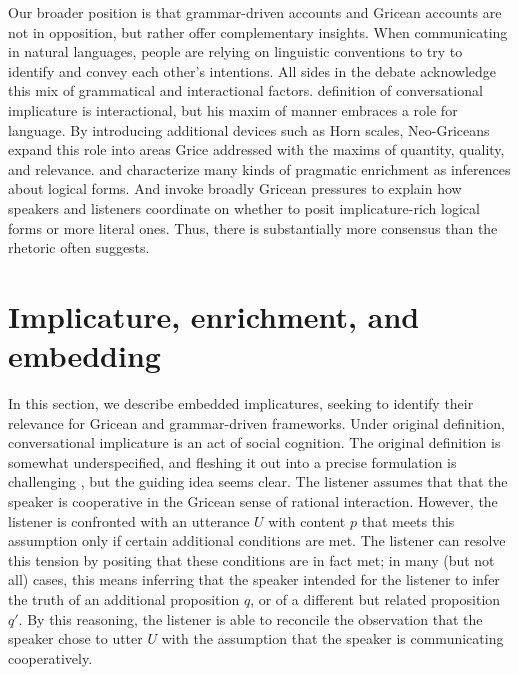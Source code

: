 \documentclass[leqno,12pt]{article}
\begin{document}
Our broader position is that grammar-driven accounts and Gricean
accounts are not in opposition, but rather offer complementary
insights.  When communicating in natural languages, people are relying
on linguistic conventions to try to identify and convey each other's
intentions. All sides in the debate acknowledge this mix of
grammatical and interactional factors.  definition
of conversational implicature is interactional, but his maxim of
manner embraces a role for language. By introducing additional devices
such as Horn scales, Neo-Griceans expand this role into areas Grice
addressed with the maxims of quantity, quality, and
relevance. \citet{Sperber95} and \citet{Bach94} characterize many
kinds of pragmatic enrichment as inferences about logical forms. And
\citet{ChierchiaFoxSpector08} invoke broadly Gricean pressures to
explain how speakers and listeners coordinate on whether to posit
implicature-rich logical forms or more literal ones. Thus, there is
substantially more consensus than the rhetoric often suggests.


\section{Implicature, enrichment, and embedding}\label{sec:implicature}

In this section, we describe embedded implicatures, seeking to
identify their relevance for Gricean and grammar-driven
frameworks. Under  original definition,
conversational implicature is an act of social cognition. The original
definition is somewhat underspecified, and fleshing it out into a
precise formulation is challenging \citep{Hirschberg85}, but the
guiding idea seems clear.  The listener assumes that that the speaker
is cooperative in the Gricean sense of rational interaction. However,
the listener is confronted with an utterance $U$ with content $p$ that
meets this assumption only if certain additional conditions are
met. The listener can resolve this tension by positing that these
conditions are in fact met; in many (but not all) cases, this means
inferring that the speaker intended for the listener to infer the
truth of an additional proposition $q$, or of a different but related
proposition $q'$. By this reasoning, the listener is able to reconcile
the observation that the speaker chose to utter $U$ with the
assumption that the speaker is communicating cooperatively.
\end{document}
